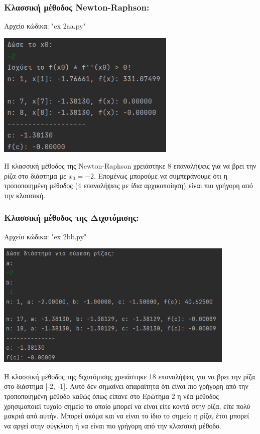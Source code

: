 \documentclass{article}
\begin{document}
    \subsubsection{Κλασσική μέθοδος Newton-Raphson:}
    Αρχείο κώδικα: "ex 2aa.py"
    \begin{center}\includegraphics[height = 6cm]{images/results_22.png}\end{center}
    Η κλασσική μέθοδος της Newton-Raphson χρειάστηκε 8 επαναλήψεις για να βρει την ρίζα στο διάστημα με \(x_{0} = -2\). Επομένως μπορούμε να συμπεράνουμε ότι η τροποποιημένη μέθοδος (4 επαναλήψεις με ίδια αρχικοποίηση) είναι πιο γρήγορη από την κλασσική.
        
    \subsubsection{Κλασσική μέθοδος της Διχοτόμισης:}
    Αρχείο κώδικα: "ex 2bb.py"
    \begin{center}\includegraphics[height = 6cm]{images/results_23.png}\end{center}
    Η κλασσική μέθοδος της διχοτόμισης χρειάστηκε 18 επαναλήψεις για να βρει την ρίζα στο διάστημα [-2, -1]. Αυτό δεν σημαίνει απαραίτητα ότι είναι πιο γρήγορη από την τροποποιημένη μέθοδο καθώς όπως είπανε στο Ερώτημα 2 η νέα μέθοδος χρησιμοποιεί τυχαίο σημείο το οποίο μπορεί να είναι είτε κοντά στην ρίζα, είτε πολύ μακριά από αυτήν. Μπορεί ακόμα και να είναι το ίδιο το σημείο η ρίζα, έτσι μπορεί να αργεί στην σύγκλιση ή να είναι πιο γρήγορη από την κλασσική μέθοδο.
\end{document}
